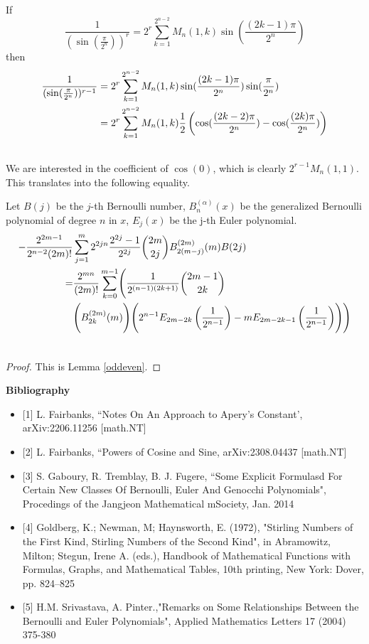 \documentclass[fleqn,a4paper,9pt]{article}
\begin{document}
\begin{flushleft}
If  $$\frac{1}{(\sin(\frac{\pi}{2^n}))^r}=2^r \sum_{k=1}^{2^{n-2}}M_n(1,k)\sin(\frac{(2k-1)\pi}{2^n})$$ then 
\begin{align}
\frac{1}{(\sin(\frac{\pi}{2^n}))^{r-1}}&=2^r \sum_{k=1}^{2^{n-2}}M_n(1,k)\sin(\frac{(2k-1)\pi}{2^n})\sin(\frac{\pi}{2^n})\\\notag
&=2^r \sum_{k=1}^{2^{n-2}}M_n(1,k)\frac{1}{2}\left(\cos(\frac{(2k-2)\pi}{2^n})-\cos(\frac{(2k)\pi}{2^n})\right)\\\notag
\end{align}
We are interested in the coefficient of $\cos(0)$, which is clearly $2^{r-1} M_n(1,1)$. This translates into the following equality.
\begin{proposition}\label{lastprop}
Let $B(j)$ be the $j$-th Bernoulli number, $B_n^{(\alpha)}(x)$ be the generalized Bernoulli polynomial of degree $n$ in $x$, $E_j(x)$ be the j-th Euler polynomial.
\begin{align}\notag
-\frac{2^{2m-1}}{2^{n-2}(2m)!}&\sum_{j=1}^{m}2^{2jn}\frac{2^{2j}-1}{2^{2j}}\binom{2m}{2j}B_{2(m-j)}^{(2m)}(m) B(2 j)\\\notag
=&\frac{2^{mn}}{(2m)!}\sum_{k=0}^{m-1}\Biggl(\frac{1}{2^{(n-1)(2k+1)}}\binom{2m-1}{2k}\\\notag
&\Biggl(B_{2k}^{(2m)}(m)\Biggr)\Biggl(2^{n-1}E_{2m-2k}\left(\frac{1}{2^{n-1}}\right)-mE_{2m-2k-1}\left(\frac{1}{2^{n-1}}\right)\Biggr)\Biggr)\\\notag
\end{align}
\end{proposition}
\begin{proof}
This is Lemma \ref{oddeven}.
\end{proof}
\begin{section}{{\textbf{Bibliography}}}
\frenchspacing
\begin{itemize}
\item{[1]} L. Fairbanks, ``Notes On An Approach to Apery's Constant',  arXiv:2206.11256 [math.NT]
\item{[2]} L. Fairbanks, ``Powers of Cosine and Sine, arXiv:2308.04437  [math.NT]
\item{[3]} S. Gaboury, R. Tremblay, B. J. Fugere, ``Some Explicit Formulasd For Certain New Classes Of Bernoulli, Euler And Genocchi Polynomials", Procedings of the Jangjeon Mathematical mSociety, Jan. 2014
\item{[4]} Goldberg, K.; Newman, M; Haynsworth, E. (1972), "Stirling Numbers of the First Kind, Stirling Numbers of the Second Kind", in Abramowitz, Milton; Stegun, Irene A. (eds.), Handbook of Mathematical Functions with Formulas, Graphs, and Mathematical Tables, 10th printing, New York: Dover, pp. 824–825
\item{[5]} H.M. Srivastava, A. Pinter.,"Remarks on Some  Relationships Between the Bernoulli and Euler Polynomials", Applied Mathematics Letters 17 (2004) 375-380
\end{itemize}
\end{section}
\end{flushleft}
\end{document}
